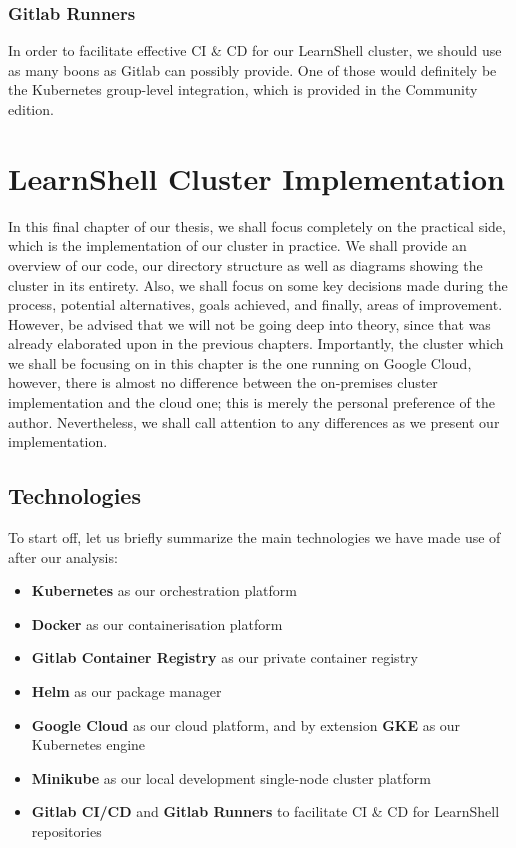 \documentclass[thesis=B,english]{FITthesis}[2019/12/23]
\begin{document}
\subsection{Gitlab Runners}

In order to facilitate effective CI \& CD for our LearnShell cluster, we should use as many boons as Gitlab can possibly provide. One of those would definitely be the Kubernetes group-level integration, which is provided in the Community edition. 





\chapter{LearnShell Cluster Implementation}

In this final chapter of our thesis, we shall focus completely on the practical side, which is the implementation of our cluster in practice. We shall provide an overview of our code, our directory structure as well as diagrams showing the cluster in its entirety. Also, we shall focus on some key decisions made during the process, potential alternatives, goals achieved, and finally, areas of improvement. However, be advised that we will not be going deep into theory, since that was already elaborated upon in the previous chapters.
\newline
Importantly, the cluster which we shall be focusing on in this chapter is the one running on Google Cloud, however, there is almost no difference between the on-premises cluster implementation and the cloud one; this is merely the personal preference of the author. Nevertheless, we shall call attention to any differences as we present our implementation.



\section{Technologies}

To start off, let us briefly summarize the main technologies we have made use of after our analysis:

\begin{itemize}
  \setlength\itemsep{0em}
  \item \textbf{Kubernetes} as our orchestration platform
  \item \textbf{Docker} as our containerisation platform
  \item \textbf{Gitlab Container Registry} as our private container registry
  \item \textbf{Helm} as our package manager
  \item \textbf{Google Cloud} as our cloud platform, and by extension \textbf{GKE} as our Kubernetes engine
  \item \textbf{Minikube} as our local development single-node cluster platform
  \item \textbf{Gitlab CI/CD} and \textbf{Gitlab Runners} to facilitate CI \& CD for LearnShell repositories
\end{itemize}
\end{document}
